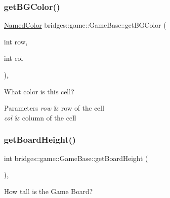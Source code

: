 \mbox{\label{classbridges_1_1game_1_1_game_base_a924f911774a89d18ccb391bb28fd703c}} 
\subsubsection{\texorpdfstring{get\+B\+G\+Color()}{getBGColor()}}
{\footnotesize\ttfamily \mbox{\hyperlink{namespacebridges_1_1game_afaa832a4322b25b6a4ebfba832f10f26}{Named\+Color}} bridges\+::game\+::\+Game\+Base\+::get\+B\+G\+Color (\begin{DoxyParamCaption}\item[{int}]{row,  }\item[{int}]{col }\end{DoxyParamCaption})\hspace{0.3cm}{\ttfamily [inline]}, {\ttfamily [protected]}}



What color is this cell? 


\begin{DoxyParams}{Parameters}
{\em row} & row of the cell \\
\hline
{\em col} & column of the cell \\
\hline
\end{DoxyParams}
\mbox{\label{classbridges_1_1game_1_1_game_base_a14510d6685e0b224c8995e397ad64adc}} 
\subsubsection{\texorpdfstring{get\+Board\+Height()}{getBoardHeight()}}
{\footnotesize\ttfamily int bridges\+::game\+::\+Game\+Base\+::get\+Board\+Height (\begin{DoxyParamCaption}{ }\end{DoxyParamCaption})\hspace{0.3cm}{\ttfamily [inline]}, {\ttfamily [protected]}}



How tall is the Game Board? 

